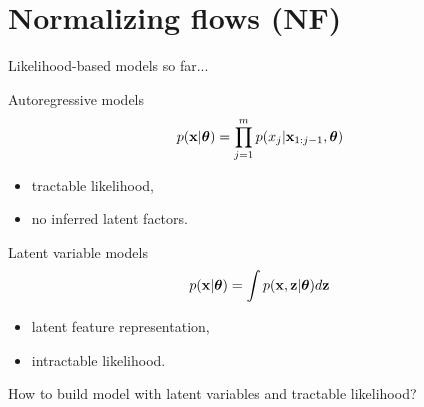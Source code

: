 \section{Normalizing flows (NF)}
\begin{frame}{Likelihood-based models so far...}
	\begin{minipage}[t]{0.5\columnwidth}
		\begin{block}{Autoregressive models}
			\vspace{-0.5cm}
			\[
				p(\mathbf{x}|\boldsymbol{\theta}) = \prod_{j=1}^m p(x_j | \mathbf{x}_{1:j - 1}, \boldsymbol{\theta})
			\]
			\vspace{-0.2cm}
			\begin{itemize}
				\item tractable likelihood, 
				\item no inferred latent factors.
			\end{itemize}
		\end{block}
	\end{minipage}%
	\begin{minipage}[t]{0.5\columnwidth}
		\begin{block}{Latent variable models}
			\[
				p(\mathbf{x}| \boldsymbol{\theta}) = \int p(\mathbf{x}, \mathbf{z} | \boldsymbol{\theta}) d \mathbf{z}
			\]
			\begin{itemize}
				\item latent feature representation, 
				\item intractable likelihood.
			\end{itemize}
		\end{block}
	\end{minipage}
	
	\vspace{1cm } 
	How to build model with latent variables and tractable likelihood?
\end{frame}
